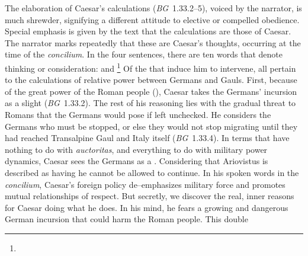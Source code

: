 \documentclass[12pt,letterpaper,oneside,final]{memoir}
\begin{document}
The elaboration of Caesar's calculations (\emph{BG}~1.33.2--5), voiced by the narrator, is much shrewder, signifying a different attitude to elective or compelled obedience. Special emphasis is given by the text that the calculations are those of Caesar. The narrator marks repeatedly that these are Caesar's thoughts, occurring at the time of the \emph{concilium}. In the four sentences, there are ten words that denote thinking or consideration:        and \footnote{} Of the  that induce him to intervene, all pertain to the calculations of relative power between Germans and Gauls. First, because of the great power of the Roman people (), Caesar takes the Germans' incursion as a slight (\emph{BG}~1.33.2). The rest of his reasoning lies with the gradual threat to Romans that the Germans would pose if left unchecked. He considers the Germans  who must be stopped, or else they would not stop migrating until they had reached Transalpine Gaul and Italy itself (\emph{BG}~1.33.4). In terms that have nothing to do with \emph{auctoritas}, and everything to do with military power dynamics, Caesar sees the Germans as a . Considering that Ariovistus is described as having  he cannot be allowed to continue. In his spoken words in the \emph{concilium}, Caesar's foreign policy de--emphasizes military force and promotes mutual relationships of respect. But secretly, we discover the real, inner reasons for Caesar doing what he does. In his mind, he fears a growing and dangerous German incursion that could harm the Roman people. This double 
\end{document}
